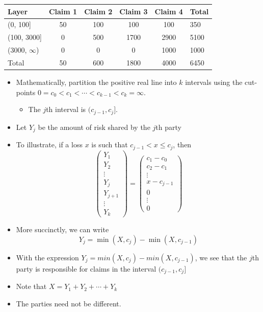 \documentclass[]{book}
\providecommand{\tightlist}{%
  \setlength{\itemsep}{0pt}\setlength{\parskip}{0pt}}
\begin{document}
\begin{longtable}[]{@{}lccccl@{}}
\toprule
Layer & Claim 1 & Claim 2 & Claim 3 & Claim 4 & Total\tabularnewline
\midrule
\endhead
(0, 100{]} & 50 & 100 & 100 & 100 & 350\tabularnewline
(100, 3000{]} & 0 & 500 & 1700 & 2900 & 5100\tabularnewline
(3000, \(\infty\)) & 0 & 0 & 0 & 1000 & 1000\tabularnewline
Total & 50 & 600 & 1800 & 4000 & 6450\tabularnewline
\bottomrule
\end{longtable}

\begin{itemize}
\item
  Mathematically, partition the positive real line into \(k\) intervals
  using the cut-points
  \(0 = c_0 < c_1 < \cdots < c_{k-1} < c_k = \infty\).

  \begin{itemize}
  \tightlist
  \item
    The \(j\)th interval is \((c_{j-1}, c_j]\).
  \end{itemize}
\item
  Let \(Y_j\) be the amount of risk shared by the \(j\)th party
\item
  To illustrate, if a loss \(x\) is such that \(c_{j-1} <x \le c_j\),
  then \[\left(\begin{array}{c}
  Y_1\\ Y_2 \\ \vdots \\ Y_j \\Y_{j+1} \\ \vdots \\Y_k
  \end{array}\right)
  =\left(\begin{array}{c}
  c_1-c_0 \\ c_2-c_1  \\ \vdots \\ x-c_{j-1}  \\ 0 \\ \vdots \\0
  \end{array}\right)\]
\item
  More succinctly, we can write \[Y_j = \min(X,c_j) - \min(X,c_{j-1})\]
\item
  With the expression \(Y_j = min(X,c_j) - min(X,c_{j-1})\), we see that
  the \(j\)th party is responsible for claims in the interval
  \((c_{j-1}, c_j]\)
\item
  Note that \(X = Y_1 + Y_2 + \cdots + Y_k\)
\item
  The parties need not be different.


\end{itemize}
\end{document}
